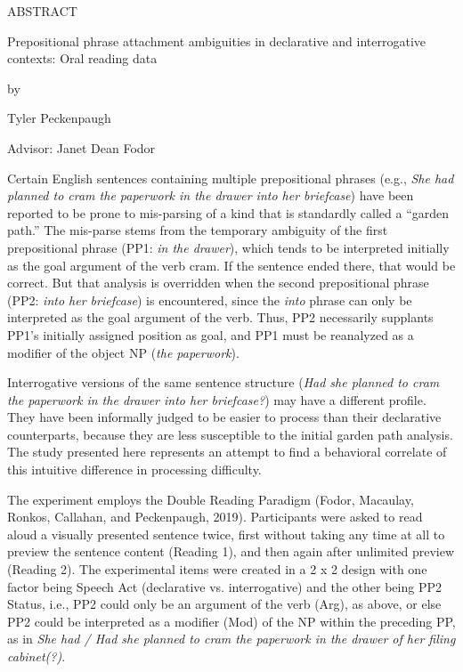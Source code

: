 \documentclass[11pt,oneside]{book}
\begin{document}
\pagebreak

ABSTRACT

\vspace{0.25in}

Prepositional phrase attachment ambiguities in declarative and interrogative contexts: Oral reading data

\vspace{0.25in}

by 

Tyler Peckenpaugh

\vspace{0.5in}

\raggedright 
Advisor: Janet Dean Fodor

\vspace{0.5in}


\setlength\parindent{24pt}\setlength{\parskip}{0.0pt plus 1.0pt}

Certain English sentences containing multiple prepositional phrases (e.g., \textit{She had planned to cram the paperwork in the drawer into her briefcase}) have been reported to be prone to mis-parsing of a kind that is standardly called a “garden path.” The mis-parse stems from the temporary ambiguity of the first prepositional phrase (PP1: \textit{in the drawer}), which tends to be interpreted initially as the goal argument of the verb cram. If the sentence ended there, that would be correct. But that analysis is overridden when the second prepositional phrase (PP2: \textit{into her briefcase}) is encountered, since the \textit{into} phrase can only be interpreted as the goal argument of the verb. Thus, PP2 necessarily supplants PP1’s initially assigned position as goal, and PP1 must be reanalyzed as a modifier of the object NP (\textit{the paperwork}).  

Interrogative versions of the same sentence structure (\textit{Had she planned to cram the paperwork in the drawer into her briefcase?}) may have a different profile. They have been informally judged to be easier to process than their declarative counterparts, because they are less susceptible to the initial garden path analysis. The study presented here represents an attempt to find a behavioral correlate of this intuitive difference in processing difficulty.

The experiment employs the Double Reading Paradigm (Fodor, Macaulay, Ronkos, Callahan, and Peckenpaugh, 2019). Participants were asked to read aloud a visually presented sentence twice, first without taking any time at all to preview the sentence content (Reading 1), and then again after unlimited preview (Reading 2). The experimental items were created in a 2 x 2 design with one factor being Speech Act (declarative vs. interrogative) and the other being PP2 Status, i.e., PP2 could only be an argument of the verb (Arg), as above, or else PP2 could be interpreted as a modifier (Mod) of the NP within the preceding PP, as in \textit{She had / Had she planned to cram the paperwork in the drawer of her filing cabinet(?)}.  
\end{document}
